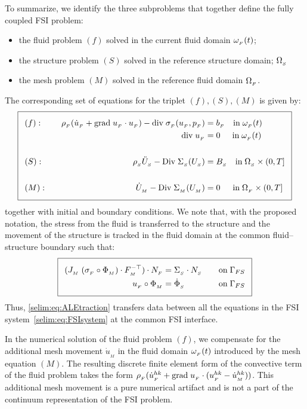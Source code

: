To summarize, we identify the three subproblems that together define
the fully coupled FSI problem:
\begin{itemize}
\item
the fluid problem $(f)$ solved in the current fluid domain $\omega_{_{F}}(t)$;
\item
the structure problem $(S)$ solved in the reference structure domain;
$\Omega_{_{S}}$
\item
the mesh problem $(M)$ solved in the reference fluid domain $\Omega_{_{F}}$.
\end{itemize}
The corresponding set of equations for the triplet
$(f),(S),(M)$ is given by:
\begin{equation}
  \addtolength{\fboxsep}{5pt} \boxed{
    \begin{split}\label{selim:eq:FSIsystem}
   &(f):&\quad \rhoF(\dotuF + \graduF\cdot\uF) -
      \divv\sigmaF(\uF,\pF) =\;& \bff \quad
      \textrm{in}\;\oF(t)\\ &&\divv\uF =\;&
      0\:\:\quad\textrm{in}\;\oF(t) \\\\ &(S):&\quad \rhoS \ddotUS -
      \Divv \SigmaS(\US) =\;& \BS \quad \textrm{in}\; \OS\times
      (0,T]\\\\ &(M):&\quad \dot{U}_{_{M}} - \Divv \SigmaM(\UM) =\;& 0
  \;\:\quad\textrm{in}\; \OF\times (0,T]
    \end{split}
  }
\end{equation}
together with initial and boundary conditions. We note that, with the
proposed notation, the stress from the fluid is transferred to the
structure and the movement of the structure is tracked in the fluid
domain at the common fluid--structure boundary such that:
\begin{equation}
  \addtolength{\fboxsep}{5pt} \boxed{
    \begin{split}\label{selim:eq:ALEtraction}
      (J_{_{M}}\;(\sigmaF\circ\PhiM) \cdot F_{_{M}}^{-\top})\cdot
      N_{_{F}} &= \SigmaS\cdot N_{_{S}} \quad &\textrm{on}\; \Gamma_{FS}\\
      \uF\circ\PhiM &= \dot{\Phi}_{_{S}} \quad &\textrm{on}\; \Gamma_{FS}\\
    \end{split}
  }
\end{equation}
Thus, \eqref{selim:eq:ALEtraction} transfers data between all the
equations in the FSI system~\eqref{selim:eq:FSIsystem} at the common
FSI interface.

In the numerical solution of the fluid problem $(f)$,
we compensate for the additional mesh movement $\dot{u}_{_{M}}$ in the
fluid domain $\omega_{_{F}}(t)$ introduced by the mesh equation $(M)$.  The
resulting discrete finite element form of the convective term of the
fluid problem takes the form $\rho_{_{F}}(\dot{u}_{_{F}}^{hk} +
\textrm{grad}\;u_{_{F}}\cdot(u_{_{F}}^{hk} - \dot{u}_{_{M}}^{hk}))$.  This additional mesh
movement is a pure numerical artifact and is not a part of the
continuum representation of the FSI problem.

